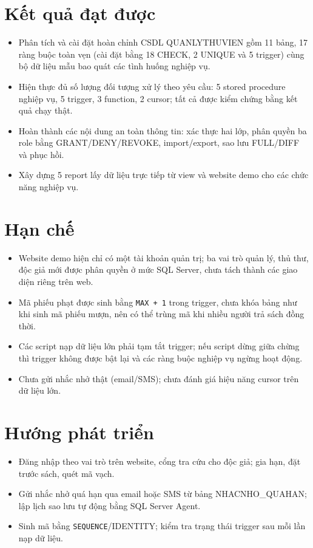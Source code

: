 \documentclass[13pt,a4paper,oneside]{extreport}
\begin{document}
\section{Kết quả đạt được}
\begin{itemize}
\item Phân tích và cài đặt hoàn chỉnh CSDL QUANLYTHUVIEN gồm 11 bảng, 17 ràng buộc toàn vẹn (cài đặt bằng 18 CHECK, 2 UNIQUE và 5 trigger) cùng bộ dữ liệu mẫu bao quát các tình huống nghiệp vụ.
\item Hiện thực đủ số lượng đối tượng xử lý theo yêu cầu: 5 stored procedure nghiệp vụ, 5 trigger, 3 function, 2 cursor; tất cả được kiểm chứng bằng kết quả chạy thật.
\item Hoàn thành các nội dung an toàn thông tin: xác thực hai lớp, phân quyền ba role bằng GRANT/DENY/REVOKE, import/export, sao lưu FULL/DIFF và phục hồi.
\item Xây dựng 5 report lấy dữ liệu trực tiếp từ view và website demo cho các chức năng nghiệp vụ.
\end{itemize}

\section{Hạn chế}
\begin{itemize}
\item Website demo hiện chỉ có một tài khoản quản trị; ba vai trò quản lý, thủ thư, độc giả mới được phân quyền ở mức SQL Server, chưa tách thành các giao diện riêng trên web.
\item Mã phiếu phạt được sinh bằng \texttt{MAX + 1} trong trigger, chưa khóa bảng như khi sinh mã phiếu mượn, nên có thể trùng mã khi nhiều người trả sách đồng thời.
\item Các script nạp dữ liệu lớn phải tạm tắt trigger; nếu script dừng giữa chừng thì trigger không được bật lại và các ràng buộc nghiệp vụ ngừng hoạt động.
\item Chưa gửi nhắc nhở thật (email/SMS); chưa đánh giá hiệu năng cursor trên dữ liệu lớn.
\end{itemize}

\section{Hướng phát triển}
\begin{itemize}
\item Đăng nhập theo vai trò trên website, cổng tra cứu cho độc giả; gia hạn, đặt trước sách, quét mã vạch.
\item Gửi nhắc nhở quá hạn qua email hoặc SMS từ bảng NHACNHO\_QUAHAN; lập lịch sao lưu tự động bằng SQL Server Agent.
\item Sinh mã bằng \texttt{SEQUENCE}/IDENTITY; kiểm tra trạng thái trigger sau mỗi lần nạp dữ liệu.
\end{itemize}
\end{document}
